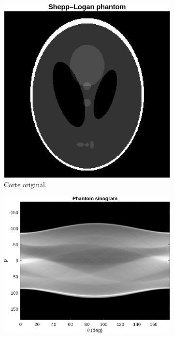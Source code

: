\documentclass[11pt]{article}
\begin{document}
\begin{figure}[H]
\centering
\begin{subfigure}[b]{0.30\textwidth}
  \includegraphics[width=\linewidth]{figures/phantom_original.png}
  \caption{Corte original.}
\end{subfigure}\hfill
\begin{subfigure}[b]{0.34\textwidth}
  \includegraphics[width=\linewidth]{figures/phantom_sinogram.png}

\end{subfigure}
\end{figure}
\end{document}
